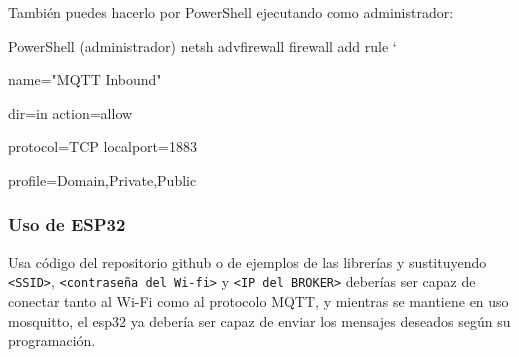 \documentclass[12pt, a4paper]{article}
\begin{document}
\begin{umaappendices}
		
		También puedes hacerlo por PowerShell ejecutando como administrador:
		\begin{Terminal}{PowerShell (administrador)}
			netsh advfirewall firewall add rule `
			
			name="MQTT Inbound" 
			
			dir=in action=allow 
			
			protocol=TCP localport=1883
			
			profile=Domain,Private,Public
		\end{Terminal}
		
		\subsubsection{Uso de ESP32}
		Usa código del repositorio github o de ejemplos de las librerías y sustituyendo \texttt{<SSID>}, \texttt{<contraseña del Wi-fi>} y \texttt{<IP del BROKER>} deberías ser capaz de conectar tanto al Wi-Fi como al protocolo MQTT, y mientras se mantiene en uso mosquitto, el esp32 ya debería ser capaz de enviar los mensajes deseados según su programación.
		
\end{umaappendices}
\end{document}
